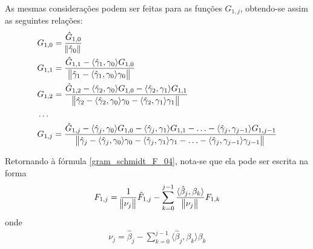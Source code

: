 As mesmas considerações podem ser feitas para as funções $G_{1,j}$, obtendo-se assim as seguintes relações:
\begin{align}
& G_{1,0} = \frac{\hat{G}_{1,0}}{\norm{\hat{\gamma}_0}} \label{gram_schmidt_G_01} \\
& G_{1,1}
=
\frac{\hat{G}_{1,1} - \langle \hat{\gamma}_1, \gamma_0\rangle G_{1,0}}
{\norm{\hat{\gamma}_1 - \langle \hat{\gamma}_1, \gamma_0\rangle\gamma_0}}\label{gram_schmidt_G_02} \\
& G_{1,2}
=
\frac{\hat{G}_{1,2} - \langle \hat{\gamma}_2, \gamma_0\rangle G_{1,0} - \langle \hat{\gamma}_2, \gamma_1\rangle G_{1,1}}
{\norm{\hat{\gamma}_2 - \langle \hat{\gamma}_2, \gamma_0\rangle\gamma_0 - \langle \hat{\gamma}_2, \gamma_1\rangle\gamma_1}} \label{gram_schmidt_G_03} \\
& \ldots \nonumber \\
& G_{1,j}
=
\frac{\hat{G}_{1,j} - \langle \hat{\gamma}_j, \gamma_0\rangle G_{1,0} - \langle \hat{\gamma}_j, \gamma_1\rangle G_{1,1} - \ldots - \langle \hat{\gamma}_j, \gamma_{j - 1}\rangle G_{1,j - 1} }
{\norm{\hat{\gamma}_j - \langle \hat{\gamma}_j, \gamma_0\rangle\gamma_0 - \langle \hat{\gamma}_j, \gamma_1\rangle\gamma_1 - \ldots - \langle \hat{\gamma}_j, \gamma_{j - 1}\rangle\gamma_{j - 1} }} \label{gram_schmidt_G_04}
\end{align}

Retornando à fórmula \eqref{gram_schmidt_F_04}, nota-se que ela pode ser escrita na forma
\begin{align}
	F_{1,j} = \frac{1}{\norm{\nu_j}}\hat{F}_{1,j} - \sum_{k=0}^{j-1} \frac{\langle \hat{\beta}_j, \beta_k \rangle}{\norm{\nu_j}} F_{1,k} \label{termo_gram}
\end{align}
onde
\begin{align}
\nu_j = \hat{\beta}_j - \sum_{k = 0}^{j - 1} \langle \hat{\beta}_j, \beta_k\rangle\beta_k
\end{align}

